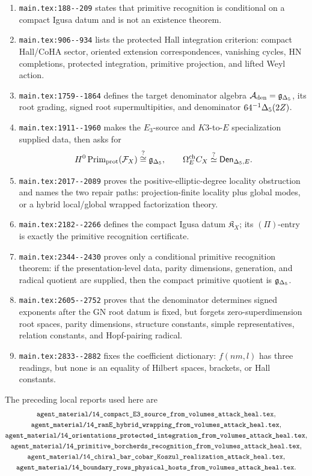 \begin{enumerate}
\item \verb|main.tex:188--209| states that primitive recognition is
conditional on a compact Igusa datum and is not an existence theorem.
\item \verb|main.tex:906--934| lists the protected Hall integration
criterion: compact Hall/CoHA sector, oriented extension
correspondences, vanishing cycles, HN completions, protected
integration, primitive projection, and lifted Weyl action.
\item \verb|main.tex:1759--1864| defines the target denominator algebra
\(\mathcal A_{\mathrm{den}}=\mathfrak g_{\Delta_5}\), its root grading, signed root supermultipities, and
denominator \(64^{-1}\Delta_5(2Z)\).
\item \verb|main.tex:1911--1960| makes the \(E_3\)-source and
\(K3\)-to-\(E\) specialization supplied data, then asks for
\[
H^0\operatorname{Prim}_{\mathrm{prot}}(\mathcal F_X)\stackrel{?}{\cong}\mathfrak g_{\Delta_5},\qquad
\Omega_E^{\mathrm{ch}}C_X\stackrel{?}{\simeq}\mathsf{Den}_{\Delta_5,E}.
\]
\item \verb|main.tex:2017--2089| proves the positive-elliptic-degree
locality obstruction and names the two repair paths: projection-finite
locality plus global modes, or a hybrid local/global wrapped
factorization theory.
\item \verb|main.tex:2182--2266| defines the compact Igusa datum
\(\mathfrak K_X\); its \((\Pi)\)-entry is exactly the primitive
recognition certificate.
\item \verb|main.tex:2344--2430| proves only a conditional primitive
recognition theorem: if the presentation-level data, parity dimensions,
generation, and radical quotient are supplied, then the compact
primitive quotient is \(\mathfrak g_{\Delta_5}\).
\item \verb|main.tex:2605--2752| proves that the denominator determines
signed exponents after the GN root datum is fixed, but forgets
zero-superdimension root spaces, parity dimensions, structure constants,
simple representatives, relation constants, and Hopf-pairing radical.
\item \verb|main.tex:2833--2882| fixes the coefficient dictionary:
\(f(nm,l)\) has three readings, but none is an equality of Hilbert
spaces, brackets, or Hall constants.
\end{enumerate}

The preceding local reports used here are
\[
\begin{gathered}
\verb|agent_material/14_compact_E3_source_from_volumes_attack_heal.tex|,\\
\verb|agent_material/14_ranE_hybrid_wrapping_from_volumes_attack_heal.tex|,\\
\verb|agent_material/14_orientations_protected_integration_from_volumes_attack_heal.tex|,\\
\verb|agent_material/14_primitive_borcherds_recognition_from_volumes_attack_heal.tex|,\\
\verb|agent_material/14_chiral_bar_cobar_Koszul_realization_attack_heal.tex|,\\
\verb|agent_material/14_boundary_rows_physical_hosts_from_volumes_attack_heal.tex|.
\end{gathered}
\]


